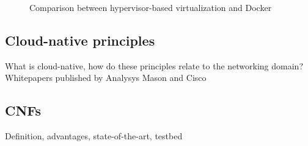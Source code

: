 \begin{figure}[H]%
	\centering
	\quad
	
	\caption{Comparison between hypervisor-based virtualization and Docker \cite{dockerdocu}}
	\label{fig:docker}
\end{figure}


\subsection{Cloud-native principles}
What is cloud-native, how do these principles relate to  the networking domain? Whitepapers published by Analysys Mason \cite{evolutionnfv} and Cisco \cite{CNF}
\subsection{CNFs}
Definition, advantages, state-of-the-art, testbed 


